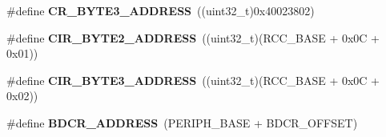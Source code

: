 \begin{DoxyCompactItemize}
\item 
\hypertarget{group___r_c_c_ga9b2724575bb34217aeddcb69c41a1547}{\#define {\bfseries C\-R\-\_\-\-B\-Y\-T\-E3\-\_\-\-A\-D\-D\-R\-E\-S\-S}~((uint32\-\_\-t)0x40023802)}\label{group___r_c_c_ga9b2724575bb34217aeddcb69c41a1547}

\item 
\hypertarget{group___r_c_c_gaab58c3f3f81bf1ab9a14cf3fececd8c4}{\#define {\bfseries C\-I\-R\-\_\-\-B\-Y\-T\-E2\-\_\-\-A\-D\-D\-R\-E\-S\-S}~((uint32\-\_\-t)(R\-C\-C\-\_\-\-B\-A\-S\-E + 0x0\-C + 0x01))}\label{group___r_c_c_gaab58c3f3f81bf1ab9a14cf3fececd8c4}

\item 
\hypertarget{group___r_c_c_ga43f47430582c9575970901533e525bb5}{\#define {\bfseries C\-I\-R\-\_\-\-B\-Y\-T\-E3\-\_\-\-A\-D\-D\-R\-E\-S\-S}~((uint32\-\_\-t)(R\-C\-C\-\_\-\-B\-A\-S\-E + 0x0\-C + 0x02))}\label{group___r_c_c_ga43f47430582c9575970901533e525bb5}

\item 
\hypertarget{group___r_c_c_ga40b5a415d697b6af7babd8a208c92435}{\#define {\bfseries B\-D\-C\-R\-\_\-\-A\-D\-D\-R\-E\-S\-S}~(P\-E\-R\-I\-P\-H\-\_\-\-B\-A\-S\-E + B\-D\-C\-R\-\_\-\-O\-F\-F\-S\-E\-T)}\label{group___r_c_c_ga40b5a415d697b6af7babd8a208c92435}

\end{DoxyCompactItemize}
